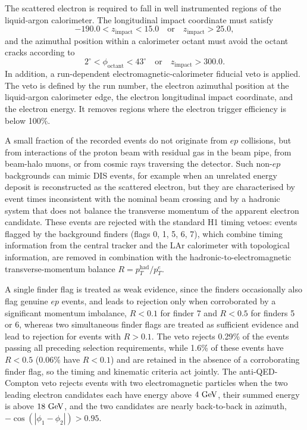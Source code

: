 The scattered electron is required to fall in well instrumented regions of the
liquid-argon calorimeter.  The longitudinal impact coordinate must satisfy
\begin{equation}
  -190.0 < z_{\mathrm{impact}} < 15.0
  \quad\mathrm{or}\quad
  z_{\mathrm{impact}} > 25.0,
\end{equation}
and the azimuthal position within a calorimeter octant must avoid the octant
cracks according to
\begin{equation}
  2^\circ < \phi_{\mathrm{octant}} < 43^\circ
  \quad\mathrm{or}\quad
  z_{\mathrm{impact}} > 300.0.
\end{equation}
In addition, a run-dependent electromagnetic-calorimeter fiducial veto is
applied.  The veto is defined by the run number, the electron azimuthal position
at the liquid-argon calorimeter edge, the electron longitudinal impact
coordinate, and the electron energy.  It removes regions where the electron
trigger efficiency is below 100\%.

A small fraction of the recorded events do not originate from $ep$ collisions,
but from interactions of the proton beam with residual gas in the beam pipe,
from beam-halo muons, or from cosmic rays traversing the detector.  Such
non-$ep$ backgrounds can mimic DIS events, for example when an unrelated
energy deposit is reconstructed as the scattered electron, but they are
characterised by event times inconsistent with the nominal beam crossing
and by a hadronic system that does not balance the transverse momentum of
the apparent electron candidate.  These events are rejected with the standard H1
timing vetoes: events flagged by the background finders
(flags 0, 1, 5, 6, 7), which combine timing information from the central tracker and the LAr calorimeter with topological information, are removed in
combination with the hadronic-to-electromagnetic transverse-momentum balance
$R=p_T^{\mathrm{had}}/p_T^{e}$.  

A single finder flag is treated as weak
evidence, since the finders occasionally also flag genuine $ep$ events, and
leads to rejection only when corroborated by a significant momentum
imbalance, $R<0.1$ for finder 7 and $R<0.5$ for finders 5 or 6, whereas two
simultaneous finder flags are treated as sufficient evidence and lead to
rejection for events with $R>0.1$.  The veto rejects 0.29\% of the events
passing all preceding selection requirements, while 1.6\% of these events
have $R<0.5$ (0.06\% have $R<0.1$) and are retained in the absence of a
corroborating finder flag, so the timing and kinematic criteria act jointly.  The anti-QED-
Compton veto rejects events with two electromagnetic particles when the two
leading electron candidates each have energy above $4~\text{GeV}$, their summed energy
is above $18~\text{GeV}$, and the two candidates are nearly back-to-back in azimuth,
$-\cos(|\phi_1-\phi_2|)>0.95$.

